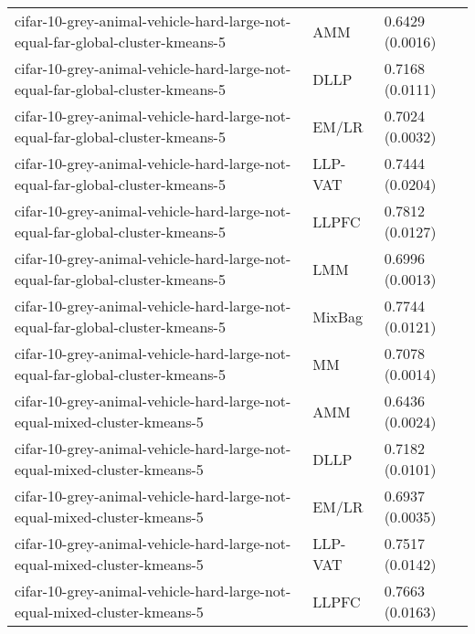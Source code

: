 \begin{longtable}{lll}
                                cifar-10-grey-animal-vehicle-hard-large-not-equal-far-global-cluster-kmeans-5 &       AMM &                           0.6429 (0.0016) \\
                                cifar-10-grey-animal-vehicle-hard-large-not-equal-far-global-cluster-kmeans-5 &      DLLP &                           0.7168 (0.0111) \\
                                cifar-10-grey-animal-vehicle-hard-large-not-equal-far-global-cluster-kmeans-5 &     EM/LR &                           0.7024 (0.0032) \\
                                cifar-10-grey-animal-vehicle-hard-large-not-equal-far-global-cluster-kmeans-5 &   LLP-VAT &                           0.7444 (0.0204) \\
                                cifar-10-grey-animal-vehicle-hard-large-not-equal-far-global-cluster-kmeans-5 &     LLPFC &                           0.7812 (0.0127) \\
                                cifar-10-grey-animal-vehicle-hard-large-not-equal-far-global-cluster-kmeans-5 &       LMM &                           0.6996 (0.0013) \\
                                cifar-10-grey-animal-vehicle-hard-large-not-equal-far-global-cluster-kmeans-5 &    MixBag &                           0.7744 (0.0121) \\
                                cifar-10-grey-animal-vehicle-hard-large-not-equal-far-global-cluster-kmeans-5 &        MM &                           0.7078 (0.0014) \\
                                     cifar-10-grey-animal-vehicle-hard-large-not-equal-mixed-cluster-kmeans-5 &       AMM &                           0.6436 (0.0024) \\
                                     cifar-10-grey-animal-vehicle-hard-large-not-equal-mixed-cluster-kmeans-5 &      DLLP &                           0.7182 (0.0101) \\
                                     cifar-10-grey-animal-vehicle-hard-large-not-equal-mixed-cluster-kmeans-5 &     EM/LR &                           0.6937 (0.0035) \\
                                     cifar-10-grey-animal-vehicle-hard-large-not-equal-mixed-cluster-kmeans-5 &   LLP-VAT &                           0.7517 (0.0142) \\
                                     cifar-10-grey-animal-vehicle-hard-large-not-equal-mixed-cluster-kmeans-5 &     LLPFC &                           0.7663 (0.0163) \\

\end{longtable}
